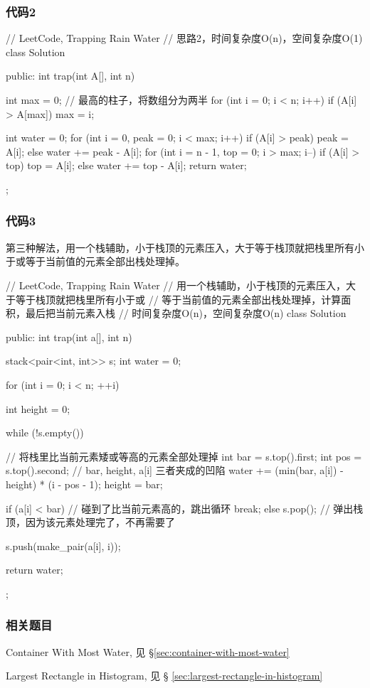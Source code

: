 \subsubsection{代码2}
\begin{Code}
	// LeetCode, Trapping Rain Water
	// 思路2，时间复杂度O(n)，空间复杂度O(1)
	class Solution {
		public:
		int trap(int A[], int n) {
			int max = 0; // 最高的柱子，将数组分为两半
			for (int i = 0; i < n; i++)
			if (A[i] > A[max]) max = i;
			
			int water = 0;
			for (int i = 0, peak = 0; i < max; i++)
			if (A[i] > peak) peak = A[i];
			else water += peak - A[i];
			for (int i = n - 1, top = 0; i > max; i--)
			if (A[i] > top) top = A[i];
			else water += top - A[i];
			return water;
		}
	};
\end{Code}


\subsubsection{代码3}
第三种解法，用一个栈辅助，小于栈顶的元素压入，大于等于栈顶就把栈里所有小于或等于当前值的元素全部出栈处理掉。
\begin{Code}
	// LeetCode, Trapping Rain Water
	// 用一个栈辅助，小于栈顶的元素压入，大于等于栈顶就把栈里所有小于或
	// 等于当前值的元素全部出栈处理掉，计算面积，最后把当前元素入栈
	// 时间复杂度O(n)，空间复杂度O(n)
	class Solution {
		public:
		int trap(int a[], int n) {
			stack<pair<int, int>> s;
			int water = 0;
			
			for (int i = 0; i < n; ++i) {
				int height = 0;
				
				while (!s.empty()) { // 将栈里比当前元素矮或等高的元素全部处理掉
					int bar = s.top().first;
					int pos = s.top().second;
					// bar, height, a[i] 三者夹成的凹陷
					water += (min(bar, a[i]) - height) * (i - pos - 1);
					height = bar;
					
					if (a[i] < bar) // 碰到了比当前元素高的，跳出循环
					break;
					else
					s.pop(); // 弹出栈顶，因为该元素处理完了，不再需要了
				}
				
				s.push(make_pair(a[i], i));
			}
			
			return water;
		}
	};
\end{Code}


\subsubsection{相关题目}
\begindot
\item Container With Most Water, 见 \S \ref{sec:container-with-most-water}
\item Largest Rectangle in Histogram, 见 \S 
\ref{sec:largest-rectangle-in-histogram}
\myenddot


